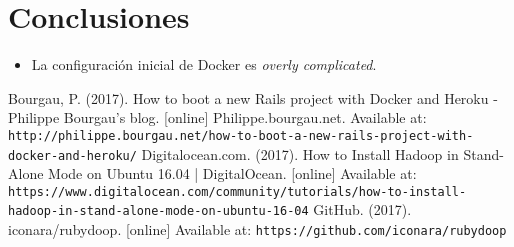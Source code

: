 \documentclass{article}
\begin{document}
\section{Conclusiones}
\begin{itemize}
  \item La configuraci\'on inicial de Docker es \emph{overly complicated}.
\end{itemize}

\begin{thebibliography}{99}
  Bourgau, P. (2017). How to boot a new Rails project with Docker and Heroku - Philippe Bourgau's blog. [online] Philippe.bourgau.net. Available at: \texttt{http://philippe.bourgau.net/how-to-boot-a-new-rails-project-with-docker-and-heroku/}
  Digitalocean.com. (2017). How to Install Hadoop in Stand-Alone Mode on Ubuntu 16.04 | DigitalOcean. [online] Available at: \texttt{https://www.digitalocean.com/community/tutorials/how-to-install-hadoop-in-stand-alone-mode-on-ubuntu-16-04}
  GitHub. (2017). iconara/rubydoop. [online] Available at: \texttt{https://github.com/iconara/rubydoop}
\end{thebibliography}
\end{document}
